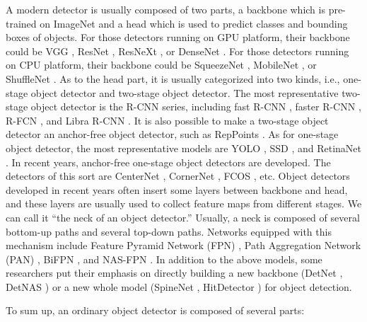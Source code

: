 \documentclass[10pt,twocolumn,letterpaper]{article}
\begin{document}
A modern detector is usually composed of two parts, a backbone which is pre-trained on ImageNet and a head which is used to predict classes and bounding boxes of objects. For those detectors running on GPU platform, their backbone could be VGG \cite{simonyan2014very}, ResNet \cite{he2016deep}, ResNeXt \cite{xie2017aggregated}, or DenseNet \cite{huang2017densely}. For those detectors running on CPU platform, their backbone could be SqueezeNet \cite{iandola2016squeezenet}, MobileNet \cite{howard2017mobilenets, sandler2018mobilenetv2, howard2019searching, tan2019mnasnet}, or ShuffleNet \cite{zhang2018shufflenet, ma2018shufflenetv2}. As to the head part, it is usually categorized into two kinds, i.e., one-stage object detector and two-stage object detector. The most representative two-stage object detector is the R-CNN \cite{girshick2014rich} series, including fast R-CNN \cite{girshick2015fast}, faster R-CNN \cite{ren2015faster}, R-FCN \cite{dai2016r}, and Libra R-CNN \cite{pang2019libra}. It is also possible to make a two-stage object detector an anchor-free object detector, such as RepPoints \cite{yang2019reppoints}.  As for one-stage object detector, the most representative models are YOLO \cite{redmon2016you, redmon2017yolo9000, redmon2018yolov3}, SSD \cite{liu2016ssd}, and RetinaNet \cite{lin2017focal}. In recent years, anchor-free one-stage object detectors are developed. The detectors of this sort are CenterNet \cite{duan2019centernet}, CornerNet \cite{law2018cornernet, law2019cornernet}, FCOS \cite{tian2019fcos}, etc. Object detectors developed in recent years often insert some layers between backbone and head, and these layers are usually used to collect feature maps from different stages. We can call it “the neck of an object detector.” Usually, a neck is composed of several bottom-up paths and several top-down paths. Networks equipped with this mechanism include Feature Pyramid Network (FPN) \cite{lin2017feature}, Path Aggregation Network (PAN) \cite{liu2018path}, BiFPN \cite{tan2019efficientdet}, and NAS-FPN \cite{ghiasi2019fpn}. In addition to the above models, some researchers put their emphasis on directly building a new backbone (DetNet \cite{li2018detnet}, DetNAS \cite{chen2019detnas}) or a new whole model (SpineNet \cite{du2019spinenet}, HitDetector \cite{guo2020hit}) for object detection.

To sum up, an ordinary object detector is composed of several parts:
\end{document}
